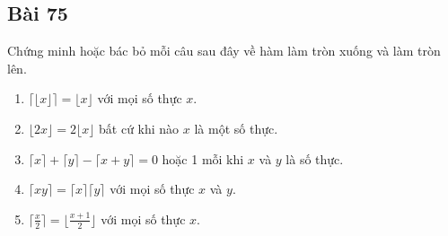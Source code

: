 \subsection*{Bài 75}
Chứng minh hoặc bác bỏ mỗi câu sau đây về hàm làm tròn xuống và làm tròn lên.
\begin{enumerate}[label=\alph*)]
    \item $\lceil\lfloor x\rfloor\rceil=\lfloor x\rfloor$ với mọi số thực $x$.
    \item $\lfloor 2x\rfloor=2\lfloor x\rfloor$ bất cứ khi nào $x$ là một số thực.
    \item $\lceil x\rceil+\lceil y\rceil-\lceil x+y\rceil=0$ hoặc 1 mỗi khi $x$ và $y$ là số thực.
    \item $\lceil xy\rceil=\lceil x\rceil\lceil y\rceil$ với mọi số thực $x$ và $y$.
    \item $\lceil\frac{x}{2}\rceil=\lfloor\frac{x+1}{2}\rfloor$ với mọi số thực $x$.
\end{enumerate}

